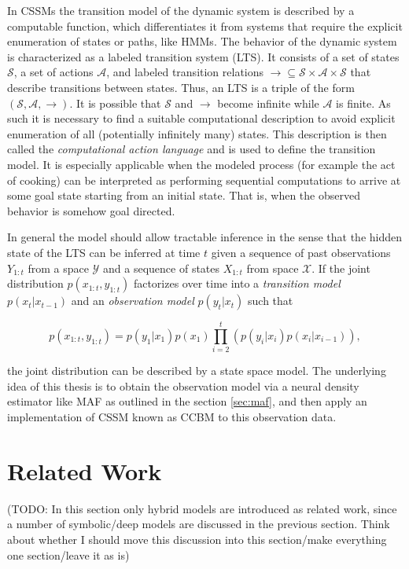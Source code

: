 \documentclass[11pt,titlepage,oneside,openany]{book}
\begin{document}
In CSSMs the transition model of the dynamic system is described by a computable function, which differentiates it from systems that require the explicit enumeration of states or paths, like HMMs. The behavior of the dynamic system is characterized as a labeled transition system (LTS). It consists of a set of states $\mathcal{S}$, a set of actions $\mathcal{A}$, and labeled transition relations $\rightarrow \subseteq \mathcal{S} \times \mathcal{A} \times \mathcal{S}$ that describe transitions between states. Thus, an LTS is a triple of the form $(\mathcal{S}, \mathcal{A}, \rightarrow)$. It is possible that $\mathcal{S}$ and $\rightarrow$ become infinite while $\mathcal{A}$ is finite. As such it is necessary to find a suitable computational description to avoid explicit enumeration of all (potentially infinitely many) states. This description is then called the \emph{computational action language} and is used to define the transition model. It is especially applicable when the modeled process (for example the act of cooking) can be interpreted as performing sequential computations to arrive at some goal state starting from an initial state. That is, when the observed behavior is somehow goal directed.

In general the model should allow tractable inference in the sense that the hidden state of the LTS can be inferred at time $t$ given a sequence of past observations $Y_{1:t}$ from a space $\mathcal{Y}$ and a sequence of states $X_{1:t}$ from space $\mathcal{X}$. If the joint distribution $p(x_{1:t}, y_{1:t})$ factorizes over time into a \emph{transition model} $p(x_t|x_{t-1})$ and an \emph{observation model} $p(y_t|x_t)$ such that

\begin{equation}
	\label{func:ssm}
	p(x_{1:t}, y_{1:t}) = p(y_1|x_1)p(x_1) \prod_{i=2}^{t} (p(y_i|x_i)p(x_i|x_{i-1})),
\end{equation}

\noindent the joint distribution can be described by a state space model. The underlying idea of this thesis is to obtain the observation model via a neural density estimator like MAF as outlined in the section \ref{sec:maf}, and then apply an implementation of CSSM known as CCBM to this observation data.

\chapter{Related Work}
\label{cha:rel}

(TODO: In this section only hybrid models are introduced as related work, since a number of symbolic/deep models are discussed in the previous section. Think about whether I should move this discussion into this section/make everything one section/leave it as is)
\end{document}
